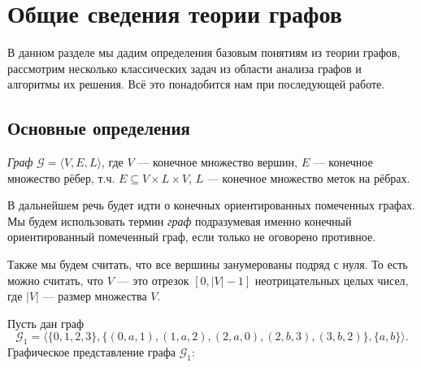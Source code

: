\chapter{Общие сведения теории графов}\label{chpt:GraphTheoryIntro}

В данном разделе мы дадим определения базовым понятиям из теории графов, рассмотрим несколько классических задач из области анализа графов и алгоритмы их решения.
Всё это понадобится нам при последующей работе.

\section{Основные определения}

\begin{definition}
  \textit{Граф} $\mathcal{G} = \langle V, E, L \rangle$, где $V$ --- конечное множество вершин, $E$ --- конечное множество рёбер, т.ч. $E \subseteq V \times L \times V$, $L$ --- конечное множество меток на рёбрах.
\end{definition}

В дальнейшем речь будет идти о конечных ориентированных помеченных графах.
Мы будем использовать термин \textit{граф} подразумевая именно конечный ориентированный помеченный граф, если только не оговорено противное.

Также мы будем считать, что все вершины занумерованы подряд с нуля.
То есть можно считать, что $V$ --- это отрезок $[0, |V| - 1]$ неотрицательных целых чисел, где $|V|$ --- размер множества $V$.

\begin{example}
  Пусть дан граф $$\mathcal{G}_1 = \langle \{0,1,2,3\}, \{(0,a,1), (1,a,2), (2,a,0), (2,b,3), (3,b,2)\}, \{a,b\} \rangle.$$
  Графическое представление графа $\mathcal{G}_1$:
  \begin{center}
  \end{center}
\end{example}


